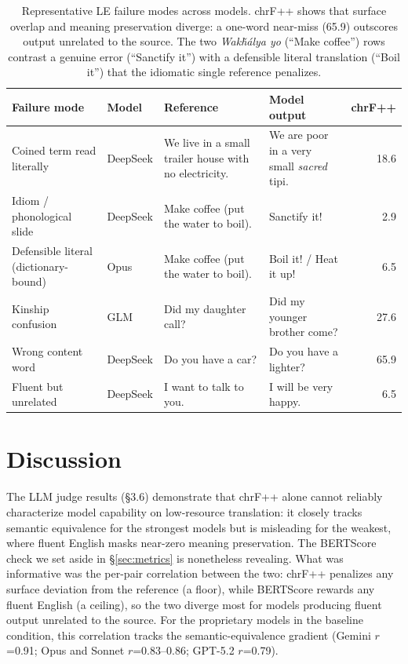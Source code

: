 \documentclass[11pt]{article}
\newcommand{\lak}[1]{\textit{#1}}
\begin{document}
\begin{table}[t]
\centering\small
\begin{tabular}{@{}p{2.7cm}lp{3.6cm}p{3.6cm}r@{}}
\toprule
\textbf{Failure mode} & \textbf{Model} & \textbf{Reference} & \textbf{Model output} & \textbf{chrF++} \\
\midrule
Coined term read literally & DeepSeek & We live in a small trailer house with no electricity. & We are poor in a very small \textit{sacred} tipi. & 18.6 \\
Idiom / phonological slide & DeepSeek & Make coffee (put the water to boil). & Sanctify it! & 2.9 \\
Defensible literal (dictionary-bound) & Opus & Make coffee (put the water to boil). & Boil it! / Heat it up! & 6.5 \\
Kinship confusion & GLM & Did my daughter call? & Did my younger brother come? & 27.6 \\
Wrong content word & DeepSeek & Do you have a car? & Do you have a lighter? & 65.9 \\
Fluent but unrelated & DeepSeek & I want to talk to you. & I will be very happy. & 6.5 \\
\bottomrule
\end{tabular}
\caption{Representative L\textrightarrow E failure modes across models. chrF++ shows that surface overlap and meaning preservation diverge: a one-word near-miss (65.9) outscores output unrelated to the source. The two \lak{Wakȟálya yo} (``Make coffee'') rows contrast a genuine error (``Sanctify it'') with a defensible literal translation (``Boil it'') that the idiomatic single reference penalizes.}
\label{tab:hallucination}
\end{table}

\section{Discussion}

The LLM judge results (\S3.6) demonstrate that chrF++ alone cannot reliably characterize model capability on low-resource translation: it closely tracks semantic equivalence for the strongest models but is misleading for the weakest, where fluent English masks near-zero meaning preservation. The BERTScore check we set aside in \S\ref{sec:metrics} is nonetheless revealing. What was informative was the per-pair correlation between the two: chrF++ penalizes any surface deviation from the reference (a floor), while BERTScore rewards any fluent English (a ceiling), so the two diverge most for models producing fluent output unrelated to the source. For the proprietary models in the baseline condition, this correlation tracks the semantic-equivalence gradient (Gemini $r$=0.91; Opus and Sonnet $r$=0.83--0.86; GPT-5.2 $r$=0.79).
\end{document}
